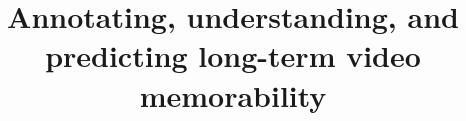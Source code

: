 \documentclass[sigconf]{acmart}
\begin{document}

\title{Annotating, understanding, and predicting long-term video memorability}






\renewcommand{\shortauthors}{Removed for blind review}%
\end{document}

